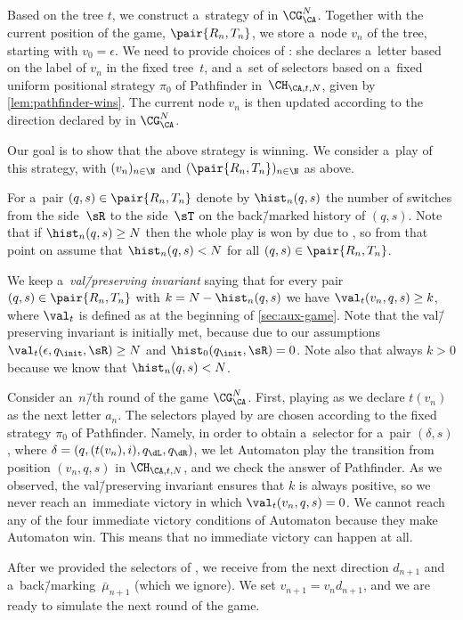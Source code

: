 Based on the tree $t$, we construct a~strategy of \eve in $\CG^N_\CA$.
Together with the current position of the game, $\pair{R_n,T_n}$, we store a~node $v_n$ of the tree, starting with $v_0=\epsilon$.
We need to provide choices of \eve:
she declares a~letter based on the label of $v_n$ in the fixed tree~$t$,
and a~set of selectors based on a~fixed uniform positional strategy $\pi_0$ of Pathfinder in~$\CH_{\CA,t,N}$, given by \cref{lem:pathfinder-wins}.
The current node $v_n$ is then updated according to the direction declared by \adam in $\CG^N_\CA$.

Our goal is to show that the above strategy is winning.
We consider a~play of this strategy, with $(v_n)_{n\in\N}$ and $(\pair{R_n,T_n})_{n\in\N}$ as above.

For a~pair $(q,s)\in\pair{R_n,T_n}$ denote by $\hist_n(q,s)$ the number of switches from the side~$\sR$ to the side~$\sT$ on the back\=/marked history of $(q,s)$.
Note that if $\hist_n(q,s)\geq N$ then the whole play is won by \eve due to , so from that point on assume that $\hist_n(q,s)< N$ for all $(q,s)\in\pair{R_n,T_n}$.

We keep a~\emph{val\=/preserving invariant} saying that for every pair $(q,s)\in\pair{R_n,T_n}$ with $k=N-\hist_n(q,s)$ we have $\val_t(v_n,q,s)\geq k$, where $\val_t$ is defined as at the beginning of \cref{sec:aux-game}.
Note that the val\=/preserving invariant is initially met, because due to our assumptions $\val_t(\epsilon,q_\init,\sR)\geq N$ and $\hist_0(q_\init,\sR)=0$.
Note also that always $k>0$ because we know that $\hist_n(q,s)<N$.


Consider an~$n$\=/th round of the game $\CG^N_\CA$.
First, playing as \eve we declare $t(v_n)$ as the next letter $a_n$.
The selectors played by \eve are chosen according to the fixed strategy $\pi_0$ of Pathfinder.
Namely, in order to obtain a~selector for a~pair $(\delta,s)$, where $\delta=(q,(t(v_n),i),q_\dL,q_\dR)$,
we let Automaton play the transition from position $(v_n,q,s)$ in $\CH_{\CA,t,N}$, and we check the answer of Pathfinder.
As we observed, the val\=/preserving invariant ensures that $k$ is always positive, so we never reach an~immediate victory in which $\val_t(v_n,q,s)=0$.
We cannot reach any of the four immediate victory conditions of Automaton because they make Automaton win.
This means that no immediate victory can happen at all.

After we provided the selectors of \eve, we receive from \adam the next direction $d_{n+1}$ and a~back\=/marking~$\bar{\mu}_{n+1}$ (which we ignore).
We set $v_{n+1}=v_nd_{n+1}$, and we are ready to simulate the next round of the game.

